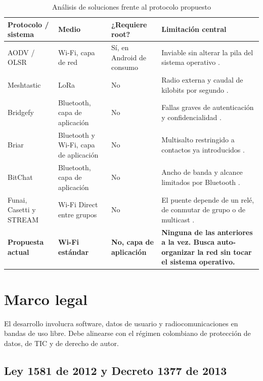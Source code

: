 \documentclass[12pt,oneside]{scrreprt}
\begin{document}
\begin{table}[H]
\centering
\singlespacing
\caption{Análisis de soluciones frente al protocolo propuesto}
\label{tab:analisis_comparativo}
\renewcommand{\arraystretch}{1.05}
\begin{tabularx}{\textwidth}{@{} >{\raggedright\arraybackslash}p{2.7cm} >{\raggedright\arraybackslash}p{2.6cm} >{\raggedright\arraybackslash}p{2.3cm} >{\raggedright\arraybackslash}X @{}}
\toprule
Protocolo / sistema & Medio & ¿Requiere root? & Limitación central \\
\midrule
AODV / OLSR & Wi-Fi, capa de red & Sí, en Android de consumo & Inviable sin alterar la pila del sistema operativo \parencite{Perkins2003,Clausen2003}. \\
Meshtastic & LoRa & No & Radio externa y caudal de kilobits por segundo \parencite{MeshtasticProject2023}. \\
Bridgefy & Bluetooth, capa de aplicación & No & Fallas graves de autenticación y confidencialidad \parencite{Albrecht2021a,Albrecht2022}. \\
Briar & Bluetooth y Wi-Fi, capa de aplicación & No & Multisalto restringido a contactos ya introducidos \parencite{BriarProject2021}. \\
BitChat & Bluetooth, capa de aplicación & No & Ancho de banda y alcance limitados por Bluetooth \parencite{Biagioni2026}. \\
Funai, Casetti y STREAM & Wi-Fi Direct entre grupos & No & El puente depende de un relé, de conmutar de grupo o de multicast \parencite{Funai2017,Casetti2015,Dao2024}. \\
\midrule
\textbf{Propuesta actual} & \textbf{Wi-Fi estándar} & \textbf{No, capa de aplicación} & \textbf{Ninguna de las anteriores a la vez. Busca auto-organizar la red sin tocar el sistema operativo.} \\
\bottomrule
\end{tabularx}
\end{table}

\section{Marco legal}
\label{sec:marco-legal}

El desarrollo involucra software, datos de usuario y radiocomunicaciones en bandas de uso libre. Debe alinearse con el régimen colombiano de protección de datos, de TIC y de derecho de autor.

\subsection{Ley 1581 de 2012 y Decreto 1377 de 2013}
\end{document}

